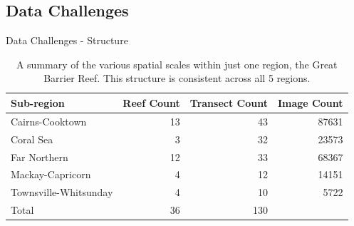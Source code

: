 \documentclass{beamer}
\begin{document}
        \subsection{Data Challenges}
            \begin{frame}{Data Challenges - Structure}
                \begin{center}
                  \begin{table}
                    \begin{tabular}{l r r r}
                      Sub-region            &   Reef Count      &   Transect Count      &   Image Count           \\ \hline
                      Cairns-Cooktown       &   13              &   43                  &   87631                 \\
                      Coral Sea             &   3               &   32                  &   23573                 \\
                      Far Northern          &   12              &   33                  &   68367                 \\
                      Mackay-Capricorn      &   4               &   12                  &   14151                 \\
                      Townsville-Whitsunday &   4               &   10                  &   5722                  \\
                      Total                 &   36              &   130                 &   {\color{red}{199444}} \\
                    \end{tabular}
                      \label{tab:GBRSummary}
                      \caption{A summary of the various spatial scales within just one region, the Great Barrier Reef. This structure is consistent across all 5 regions.}
                  \end{table}
                \end{center}
            \end{frame}
\end{document}
